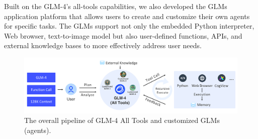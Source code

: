 Built on the GLM-4's all-tools capabilities, we also developed the GLMs application platform that allows users to create and customize their own agents for specific tasks. 
The GLMs support not only the embedded Python interpreter, Web browser, text-to-image model but also user-defined functions, APIs, and external knowledge bases to more effectively address user needs. 

 



 
\begin{figure}[tb]
    \centering
    \includegraphics[width=\linewidth]{figs/glm4-alltools.pdf}
    \caption{The overall pipeline of GLM-4 All Tools and customized GLMs (agents). %
    }
    \label{fig:alltools-arch}
\end{figure}




